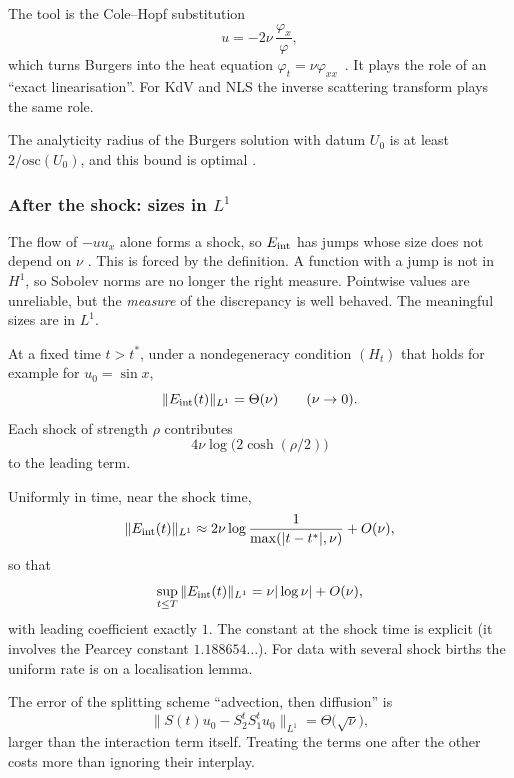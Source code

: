 The tool is the Cole--Hopf substitution
\[
u=-2\nu\,\frac{\varphi_x}{\varphi},
\]
which turns Burgers into the heat equation $\varphi_t=\nu\varphi_{xx}$~\cite{ch}. It plays the role of an ``exact linearisation''. For KdV and NLS the inverse scattering transform plays the same role.

The analyticity radius of the Burgers solution with datum $U_0$ is at least $2/\mathrm{osc}(U_0)$, and this bound is optimal  \proved.

\subsubsection{After the shock: sizes in $L^1$}

The flow of $-uu_x$ alone forms a shock, so $E_{\mathrm{int}}$ has jumps whose size does not depend on $\nu$  \modulo{[F1]}. This is forced by the definition. A function with a jump is not in $H^1$, so Sobolev norms are no longer the right measure. Pointwise values are unreliable, but the \emph{measure} of the discrepancy is well behaved. The meaningful sizes are in $L^1$.

\begin{theorem}\label{thm:shock}
At a fixed time $t>t^*$, under a nondegeneracy condition $(H_t)$ that holds for example for $u_0=\sin x$,
\[
\|E_{\mathrm{int}}(t)\|_{L^1}=\Theta(\nu)\qquad(\nu\to0).
\]
Each shock of strength $\rho$ contributes
\[
4\nu\log\big(2\cosh(\rho/2)\big)
\]
to the leading term.

\end{theorem}

\begin{theorem}\label{thm:uniform}
Uniformly in time, near the shock time,
\[
\|E_{\mathrm{int}}(t)\|_{L^1}\approx2\nu\log\frac{1}{\max(|t-t^*|,\nu)}+O(\nu),
\]
so that
\[
\sup_{t\le T}\|E_{\mathrm{int}}(t)\|_{L^1}=\nu|\log\nu|+O(\nu),
\]
with leading coefficient exactly $1$. The constant at the shock time is explicit (it involves the Pearcey constant $1.188654\ldots$). For data with several shock births the uniform rate is \condl{} on a localisation lemma.

\end{theorem}

\begin{proposition}\label{prop:splitting}
The error of the splitting scheme ``advection, then diffusion'' is
\[
\|S(t)u_0-S_2^tS_1^tu_0\|_{L^1}=\Theta\big(\sqrt\nu\big),
\]
larger than the interaction term itself. Treating the terms one after the other costs more than ignoring their interplay.

\end{proposition}

